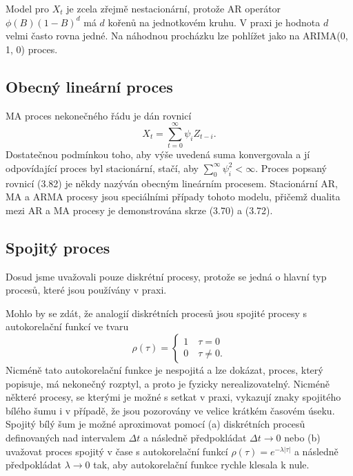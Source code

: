 Model pro $X_t$ je zcela zřejmě nestacionární, protože AR operátor $\phi(B)(1 - B)^d$ má $d$ kořenů na jednotkovém kruhu. V praxi je hodnota $d$ velmi často rovna jedné. Na náhodnou procházku lze pohlížet jako na ARIMA(0, 1, 0) proces.

\subsection{Obecný lineární proces}

MA proces nekonečného řádu je dán rovnicí
\begin{equation}
X_t = \sum_{t=0}^{\infty} \psi_i Z_{t - i}.
\end{equation}
Dostatečnou podmínkou toho, aby výše uvedená suma konvergovala a jí odpovídající proces byl stacionární, stačí, aby $\sum_0^{\infty} \psi_i^2 < \infty$. Proces popsaný rovnicí (3.82) je někdy nazýván obecným lineárním procesem. Stacionární AR, MA a ARMA procesy jsou speciálními případy tohoto modelu, přičemž dualita mezi AR a MA procesy je demonstrována skrze (3.70) a (3.72).

\subsection{Spojitý proces}

Dosud jsme uvažovali pouze diskrétní procesy, protože se jedná o hlavní typ procesů, které jsou používány v praxi.

Mohlo by se zdát, že analogií diskrétních procesů jsou spojité procesy s autokorelační funkcí ve tvaru
\begin{equation}
\rho(\tau) = 
\begin{cases}
1 \quad \tau = 0\\
0 \quad \tau \ne 0.
\end{cases}
\end{equation}
Nicméně tato autokorelační funkce je nespojitá a lze dokázat, proces, který popisuje, má nekonečný rozptyl, a proto je fyzicky nerealizovatelný. Nicméně některé procesy, se kterými je možné s setkat v praxi, vykazují znaky spojitého bílého šumu i v případě, že jsou pozorovány ve velice krátkém časovém úseku. Spojitý bílý šum je možné aproximovat pomocí (a) diskrétních procesů definovaných nad intervalem $\Delta t$ a následně předpokládat $\Delta t \rightarrow 0$ nebo (b) uvažovat proces spojitý v čase s autokorelační funkcí $\rho(\tau) = e^{-\lambda|\tau|}$ a následně předpokládat $\lambda \rightarrow 0$ tak, aby autokorelační funkce rychle klesala k nule.

